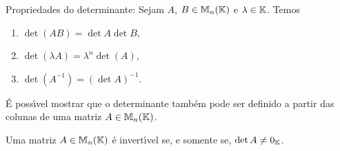 Propriedades do determinante: Sejam $A$, $B \in \mathbb{M}_n(\mathbb{K})$ e $\lambda \in \mathbb{K}$. Temos
\begin{enumerate}
	\item $\det(AB) = \det A \det B$,
	\item $\det(\lambda A) = \lambda^n \det(A)$,
	\item $\det(A^{-1}) = (\det A)^{-1}$.
\end{enumerate}

\begin{observacao}
\'E poss{\'\i}vel mostrar que o determinante tamb\'em pode ser definido a partir das colunas de uma matriz $A \in \mathbb{M}_n(\mathbb{K})$.
\end{observacao}

\begin{teorema}
Uma matriz $A \in \mathbb{M}_n(\mathbb{K})$ \'e invert{\'\i}vel se, e somente se, $\det A \ne 0_{\mathbb{K}}$.
\end{teorema}